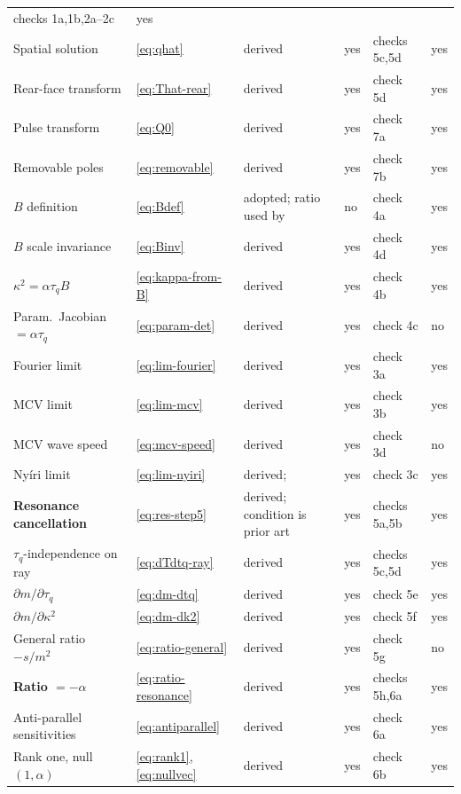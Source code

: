 \documentclass[11pt,a4paper]{article}
\theoremstyle{definition}
\newcommand{\tq}{\tau_{q}}
\newcommand{\kk}{\kappa^{2}}
\newcommand{\Bnum}{B}
\begin{document}
\begin{longtable}{@{}p{3.5cm}p{1.6cm}p{2.6cm}p{1.5cm}p{1.5cm}p{1.6cm}@{}}
  checks 1a,1b,2a--2c & yes \\
Spatial solution & \eqref{eq:qhat} & derived & yes & checks 5c,5d & yes \\
Rear-face transform & \eqref{eq:That-rear} & derived & yes & check 5d & yes \\
Pulse transform & \eqref{eq:Q0} & derived & yes & check 7a & yes \\
Removable poles & \eqref{eq:removable} & derived & yes & check 7b & yes \\
$\Bnum$ definition & \eqref{eq:Bdef} & adopted; ratio used by
  \cite{FeherKovacs2021,Van2017} & no & check 4a & yes \\
$\Bnum$ scale invariance & \eqref{eq:Binv} & derived & yes & check 4d & yes \\
$\kk=\alpha\tq\Bnum$ & \eqref{eq:kappa-from-B} & derived & yes &
  check 4b & yes \\
Param.\ Jacobian $=\alpha\tq$ & \eqref{eq:param-det} & derived & yes &
  check 4c & no \\
Fourier limit & \eqref{eq:lim-fourier} & derived & yes & check 3a & yes \\
MCV limit & \eqref{eq:lim-mcv} & derived & yes & check 3b & yes \\
MCV wave speed & \eqref{eq:mcv-speed} & derived & yes & check 3d & no \\
Nyíri limit & \eqref{eq:lim-nyiri} & derived; \cite{Nyiri1991} & yes &
  check 3c & yes \\
\textbf{Resonance cancellation} & \eqref{eq:res-step5} & derived; condition is
  prior art \cite{FulopKovacsVan2015,Kovacs2018,Fulop2018entropy} & yes &
  checks 5a,5b & yes \\
$\tq$-independence on ray & \eqref{eq:dTdtq-ray} & derived & yes &
  checks 5c,5d & yes \\
$\partial m/\partial\tq$ & \eqref{eq:dm-dtq} & derived & yes & check 5e & yes \\
$\partial m/\partial\kk$ & \eqref{eq:dm-dk2} & derived & yes & check 5f & yes \\
General ratio $-s/m^{2}$ & \eqref{eq:ratio-general} & derived & yes &
  check 5g & no \\
\textbf{Ratio $=-\alpha$} & \eqref{eq:ratio-resonance} & derived & yes &
  checks 5h,6a & yes \\
Anti-parallel sensitivities & \eqref{eq:antiparallel} & derived & yes &
  check 6a & yes \\
Rank one, null $(1,\alpha)$ & \eqref{eq:rank1},\eqref{eq:nullvec} & derived &
  yes & check 6b & yes \\

\end{longtable}
\end{document}
